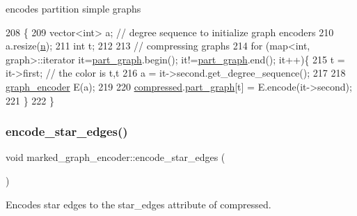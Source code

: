 encodes partition simple graphs 


\begin{DoxyCode}
208 \{
209   vector<int> a; \textcolor{comment}{// degree sequence to initialize graph encoders }
210   a.resize(\hyperlink{classmarked__graph__encoder_a4c66d9fdbc14c97523715aac7e4511cb}{n});
211   \textcolor{keywordtype}{int} t;
212 
213   \textcolor{comment}{// compressing graphs}
214   \textcolor{keywordflow}{for} (map<int, graph>::iterator it=\hyperlink{classmarked__graph__encoder_adbafd0769ae301acc1b2c19b5e1d4844}{part\_graph}.begin(); it!=\hyperlink{classmarked__graph__encoder_adbafd0769ae301acc1b2c19b5e1d4844}{part\_graph}.end(); it++)\{
215     t = it->first; \textcolor{comment}{// the color is t,t}
216     a = it->second.get\_degree\_sequence();
217 
218     \hyperlink{classgraph__encoder}{graph\_encoder} E(a);
219 
220     \hyperlink{classmarked__graph__encoder_ac2ded200860fdd2321f86dd76b28bcb3}{compressed}.\hyperlink{classmarked__graph__compressed_ae179a4737e6eab905c18a94d44ef64b7}{part\_graph}[t] = E.encode(it->second);
221   \}  
222 \}
\end{DoxyCode}
\mbox{\label{classmarked__graph__encoder_ad6883669a47d24e3d9898978f3252727}} 
\subsubsection{\texorpdfstring{encode\+\_\+star\+\_\+edges()}{encode\_star\_edges()}}
{\footnotesize\ttfamily void marked\+\_\+graph\+\_\+encoder\+::encode\+\_\+star\+\_\+edges (\begin{DoxyParamCaption}{ }\end{DoxyParamCaption})\hspace{0.3cm}{\ttfamily [private]}}



Encodes star edges to the star\+\_\+edges attribute of compressed. 


